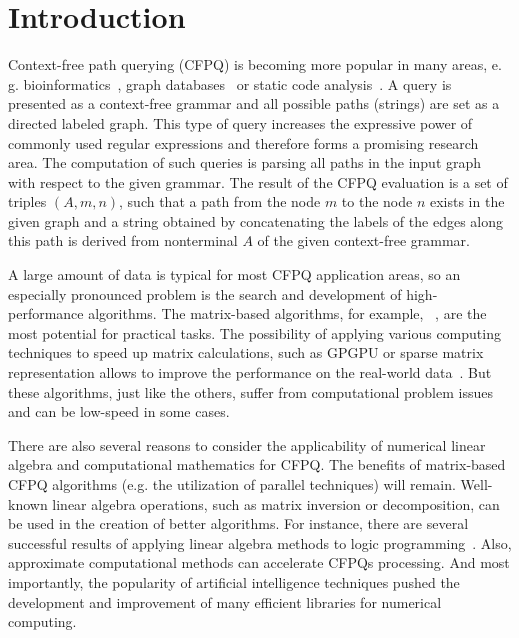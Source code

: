\documentclass[sigconf]{acmart}
\begin{document}



\maketitle

\section{Introduction}

Context-free path querying (CFPQ) is becoming more popular in many areas, e. g. bioinformatics~\cite{Bio}, graph databases~\cite{graphDB} or static code analysis~\cite{zhang2013fast}. 
A query is presented as a context-free grammar and all possible paths (strings) are set as a directed labeled graph. 
This type of query increases the expressive power of commonly used regular expressions and therefore forms a promising research area.
The computation of such queries is parsing all paths in the input graph with respect to the given grammar. 
The result of the CFPQ evaluation is a set of triples $(A, m, n)$, such that a path from the node $m$ to the node $n$ exists in the given graph and a string obtained by concatenating the labels of the edges along this path is derived from nonterminal $A$ of the given context-free grammar.

A large amount of data is typical for most CFPQ application areas, so an especially pronounced problem is the search and development of high-performance algorithms.
The matrix-based algorithms, for example, ~\cite{azimov2018context}, are the most potential for practical tasks.
The possibility of applying various computing techniques to speed up matrix calculations, such as GPGPU or sparse matrix representation allows to improve the performance on the real-world data~\cite{mishin2019evaluation}.
But these algorithms, just like the others, suffer from computational problem issues and can be low-speed in some cases.

There are also several reasons to consider the applicability of numerical linear algebra and computational mathematics for CFPQ.
The benefits of matrix-based CFPQ algorithms (e.g. the utilization of parallel techniques) will remain.
Well-known linear algebra operations, such as matrix inversion or decomposition, can be used in the creation of better algorithms. 
For instance, there are several successful results of applying linear algebra methods to logic programming~\cite{sato2017linear, aspis2018linear}. 
Also, approximate computational methods can accelerate CFPQs processing.
And most importantly, the popularity of artificial intelligence techniques pushed the development and improvement of many efficient libraries for numerical computing.
\end{document}

